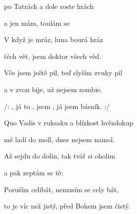 

   

\zs
{} po Tatrách a dole roste hrách

a  jen mám, toulám se 

V  když je mráz, luna bourá hráz

těch  vět, jsem doktor všech věd.

Vče jsem ještě pil, teď slyším zvuky pil

a v  zvon bije, už nejsem zombie.
\ks

\zr
/: , já to ,
jsem , já jsem básník. :/
\kr

   

\zs
Quo Vadis v ruksaku a blízkost hvězdokup

mě ladí do moll, dnes nejsem namol.

Až sejdu do dolin, tak tvář si oholim

a pak zeptám se tě: 

Poruším celibát, nemusím se cely bát,

to je víc než jistý, před Bohem jsem čistý.
\ks

\zr   \kr  \zr  \kr  \zr  \kr

\kp





